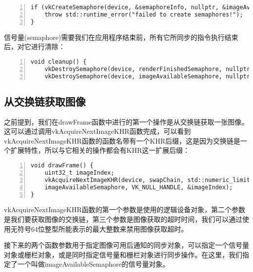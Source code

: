 \documentclass{ctexart}
\begin{document}
\begin{lstlisting}[language={[ANSI]C},keywordstyle=\color{blue!70},commentstyle=\color{red!50!green!50!blue!50},frame=shadowbox, rulesepcolor=\color{red!20!green!20!blue!20},basicstyle=\small,numbers=left, numberstyle=\tiny,breaklines=true]
if (vkCreateSemaphore(device, &semaphoreInfo, nullptr, &imageAvailableSemaphore) != VK_SUCCESS || vkCreateSemaphore(device, &semaphoreInfo, nullptr, &renderFinishedSemaphore) != VK_SUCCESS) {
	throw std::runtime_error("failed to create semaphores!");
}
\end{lstlisting}

信号量(semaphore)需要我们在应用程序结束前，所有它所同步的指令执行结束后，对它进行清除：

\begin{lstlisting}[language={[ANSI]C},keywordstyle=\color{blue!70},commentstyle=\color{red!50!green!50!blue!50},frame=shadowbox, rulesepcolor=\color{red!20!green!20!blue!20},basicstyle=\small,numbers=left, numberstyle=\tiny,breaklines=true]
void cleanup() {
	vkDestroySemaphore(device, renderFinishedSemaphore, nullptr);
	vkDestroySemaphore(device, imageAvailableSemaphore, nullptr);
\end{lstlisting}

\subsection{从交换链获取图像}

之前提到，我们在drawFrame函数中进行的第一个操作是从交换链获取一张图像。这可以通过调用vkAcquireNextImageKHR函数完成，可以看到vkAcquireNextImageKHR函数的函数名带有一个KHR后缀，这是因为交换链是一个扩展特性，所以与它相关的操作都会有KHR这一扩展后缀：

\begin{lstlisting}[language={[ANSI]C},keywordstyle=\color{blue!70},commentstyle=\color{red!50!green!50!blue!50},frame=shadowbox, rulesepcolor=\color{red!20!green!20!blue!20},basicstyle=\small,numbers=left, numberstyle=\tiny,breaklines=true]
void drawFrame() {
	uint32_t imageIndex;
	vkAcquireNextImageKHR(device, swapChain, std::numeric_limits<uint64_t>::max(),
	imageAvailableSemaphore, VK_NULL_HANDLE, &imageIndex);
}
\end{lstlisting}

vkAcquireNextImageKHR函数的第一个参数是使用的逻辑设备对象，第二个参数是我们要获取图像的交换链，第三个参数是图像获取的超时时间，我们可以通过使用无符号64位整型所能表示的最大整数来禁用图像获取超时。

接下来的两个函数参数用于指定图像可用后通知的同步对象，可以指定一个信号量对象或栅栏对象，或是同时指定信号量和栅栏对象进行同步操作。在这里，我们指定了一个叫做imageAvailableSemaphore的信号量对象。
\end{document}
